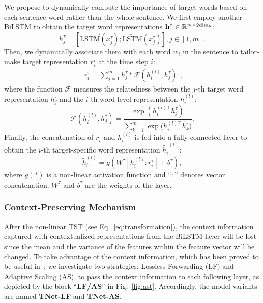\documentclass[11pt,a4paper]{article}
\begin{document}
We propose to dynamically compute the importance of target words based on each sentence word rather than the whole sentence. We first employ another BiLSTM to obtain the target word representations $\mathrm{\bf h}^{\tau} \in \mathbb{R}^{m \times 2\mathrm{dim}_h}$:
\begin{equation}
h^{\tau}_j = [\overrightarrow{\text{LSTM}}(x^{\tau}_j); \overleftarrow{\text{LSTM}}(x^{\tau}_j)], j \in [1, m].
\end{equation}
Then, we dynamically associate them with each word $w_i$ in the sentence to tailor-make target representation $r^{\tau}_i$ at the time step $i$:
\begin{equation}
\label{eq:ast}
\begin{split}
r^{\tau}_i = \sum^{m}_{j=1} h^{\tau}_j * \mathcal{F}(h^{(l)}_i, h^{\tau}_j)
\end{split},
\end{equation}
where the function $\mathcal{F}$ measures the relatedness between the $j$-th target word representation $h^{\tau}_j$ and the $i$-th word-level representation $h^{(l)}_i$:
\begin{equation}
    \mathcal{F}(h^{(l)}_i, h^{\tau}_j) = \frac{\exp{(h^{(l)\top}_i h^{\tau}_j)}}{\sum^m_{k=1} \exp{(h^{(l)\top}_i h^{\tau}_k})}.
\end{equation}
Finally, the concatenation of $r^{\tau}_i$ and $h^{(l)}_i$ is fed into a fully-connected layer to obtain the $i$-th target-specific word representation $\tilde{h_i}^{(l)}$:
\begin{equation}
\label{eq:transformation}
\tilde{h}^{(l)}_i = g(W^{\tau}[h^{(l)}_i: r^{\tau}_i] + b^{\tau}),
\end{equation}
where $g(*)$ is a non-linear activation function and ``$:$'' denotes vector concatenation. $W^{\tau}$ and $b^{\tau}$ are the weights of the layer.
\subsubsection{Context-Preserving Mechanism}
After the non-linear TST (see Eq.~\ref{eq:transformation}), the context information captured with contextualized representations from the BiLSTM layer
will be lost since the mean and the variance of the features within the feature vector will be changed. To take advantage of the context information, which has been proved to be useful in~\cite{lai2015recurrent}, we investigate two strategies: Lossless Forwarding (LF) and Adaptive Scaling (AS), to pass the context information to each following layer, as depicted by the block ``\textbf{LF/AS}'' in Fig.~\ref{fig:ast}. Accordingly, the model variants are named \textbf{TNet-LF} and \textbf{TNet-AS}.
\end{document}
